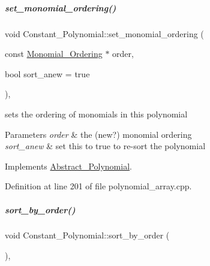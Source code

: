 \mbox{\label{group__polygroup_a539835f92490fbbb5ba3b37e4f80ef49}} 
\subparagraph{\texorpdfstring{set\+\_\+monomial\+\_\+ordering()}{set\_monomial\_ordering()}}
{\footnotesize\ttfamily void Constant\+\_\+\+Polynomial\+::set\+\_\+monomial\+\_\+ordering (\begin{DoxyParamCaption}\item[{const \hyperlink{group__orderinggroup_class_monomial___ordering}{Monomial\+\_\+\+Ordering} $\ast$}]{order,  }\item[{bool}]{sort\+\_\+anew = {\ttfamily true} }\end{DoxyParamCaption})\hspace{0.3cm}{\ttfamily [override]}, {\ttfamily [virtual]}}



sets the ordering of monomials in this polynomial 


\begin{DoxyParams}{Parameters}
{\em order} & the (new?) monomial ordering \\
\hline
{\em sort\+\_\+anew} & set this to {\ttfamily true} to re-\/sort the polynomial \\
\hline
\end{DoxyParams}


Implements \hyperlink{group__polygroup_a12e023570eb675343c4b7ed635a031dc}{Abstract\+\_\+\+Polynomial}.



Definition at line 201 of file polynomial\+\_\+array.\+cpp.

\mbox{\label{group__polygroup_a808018b52eca472a7a1b2995e403f35a}} 
\subparagraph{\texorpdfstring{sort\+\_\+by\+\_\+order()}{sort\_by\_order()}}
{\footnotesize\ttfamily void Constant\+\_\+\+Polynomial\+::sort\+\_\+by\+\_\+order (\begin{DoxyParamCaption}{ }\end{DoxyParamCaption})\hspace{0.3cm}{\ttfamily [override]}, {\ttfamily [virtual]}}



